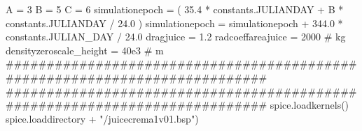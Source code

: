 \markdownRendererInterblockSeparator
{}A = 3 B = 5 C = 6 simulationepoch = ( 35.4 * constants.JULIANDAY + B * constants.JULIANDAY / 24.0 ) simulationepoch = simulationepoch + 344.0 * constants.JULIAN_DAY / 24.0\markdownRendererInterblockSeparator
{}
\markdownRendererSectionEnd \markdownRendererSectionBegin
{}\markdownRendererInterblockSeparator
{}
\markdownRendererSectionEnd \markdownRendererSectionBegin
{}\markdownRendererInterblockSeparator
{}dragjuice = 1.2 radcoeffareajuice = 2000 # kg\markdownRendererInterblockSeparator
{}
\markdownRendererSectionEnd \markdownRendererSectionBegin
{}\markdownRendererInterblockSeparator
{}densityzeroscale_height = 40e3 # m\markdownRendererInterblockSeparator
{}###########################################################################\markdownRendererInterblockSeparator
{}
\markdownRendererSectionEnd \markdownRendererSectionBegin
{}\markdownRendererInterblockSeparator
{}###########################################################################\markdownRendererInterblockSeparator
{}
\markdownRendererSectionEnd \markdownRendererSectionBegin
{}\markdownRendererInterblockSeparator
{}spice.loadkernels() spice.loaddirectory + "/juicecrema1v01.bsp")\markdownRendererInterblockSeparator
{}
\markdownRendererSectionEnd \markdownRendererSectionBegin
{}\markdownRendererInterblockSeparator
